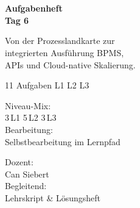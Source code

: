 \documentclass[11pt,a4paper,oneside]{article}
\begin{document}
\begin{titlepage}
  \pagestyle{empty}
  \vspace*{1.5cm}
  \\[2pt]
  \noindent{\color{lpAccent}\rule{\linewidth}{1.2pt}}\\[4pt]

  \vspace{3cm}
  {\sffamily\fontsize{30}{34}\selectfont\bfseries\color{lpInk}Aufgabenheft\\Tag 6\par}

  \vspace{0.7cm}
  {\sffamily\large\color{lpGray}Von der Prozesslandkarte zur\\integrierten Ausf\"uhrung \textendash{} BPMS,\\APIs und Cloud-native Skalierung.\par}

  \vspace{1.5cm}
  {\caveatfont\LARGE\color{lpAmber}11 Aufgaben \textperiodcentered{} L1 \textperiodcentered{} L2 \textperiodcentered{} L3}\par

  \vfill

  \noindent\begin{minipage}{0.55\linewidth}
    {\sffamily\footnotesize\color{lpGray}Niveau-Mix:}\\
    {\sffamily\small\color{lpInk}3\,\textsf{L1} \textperiodcentered{} 5\,\textsf{L2} \textperiodcentered{} 3\,\textsf{L3}}\\[10pt]
    {\sffamily\footnotesize\color{lpGray}Bearbeitung:}\\
    {\sffamily\small\color{lpInk}Selbstbearbeitung im Lernpfad}
  \end{minipage}\hfill
  \begin{minipage}{0.4\linewidth}
    \raggedleft
    {\sffamily\footnotesize\color{lpGray}Dozent:}\\
    {\sffamily\small\color{lpInk}Can Siebert}\\[10pt]
    {\sffamily\footnotesize\color{lpGray}Begleitend:}\\
    {\sffamily\small\color{lpInk}Lehrskript \& L\"osungsheft}
  \end{minipage}

  \vspace{0.5cm}
  \noindent{\color{lpAccent}\rule{\linewidth}{0.6pt}}
\end{titlepage}
\end{document}
